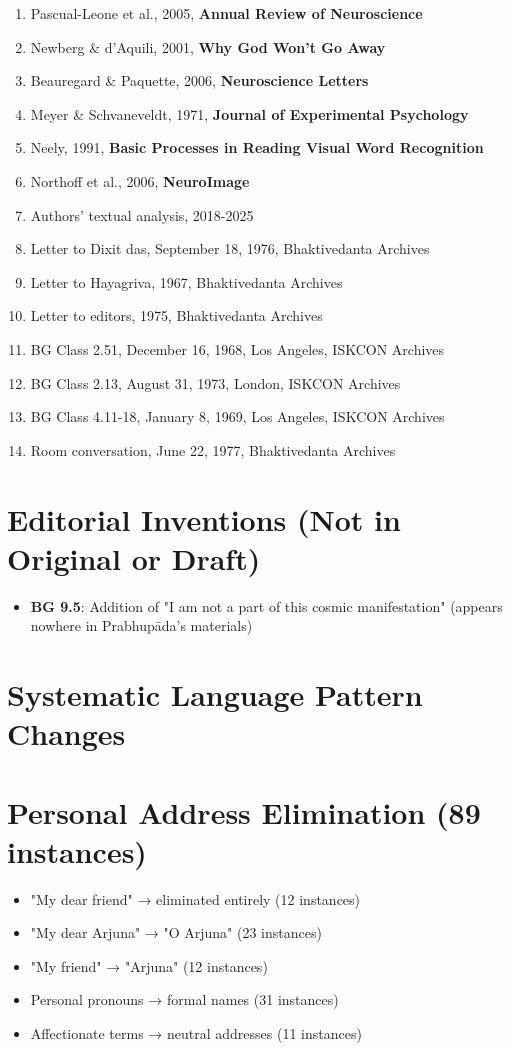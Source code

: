 \documentclass[11pt,twoside]{book}
\begin{document}
\begin{enumerate}
\item Pascual-Leone et al., 2005, \textbf{Annual Review of Neuroscience}
\item Newberg \& d'Aquili, 2001, \textbf{Why God Won't Go Away}
\item Beauregard \& Paquette, 2006, \textbf{Neuroscience Letters}
\item Meyer \& Schvaneveldt, 1971, \textbf{Journal of Experimental Psychology}
\item Neely, 1991, \textbf{Basic Processes in Reading Visual Word Recognition}
\item Northoff et al., 2006, \textbf{NeuroImage}
\item Authors' textual analysis, 2018-2025
\item Letter to Dixit das, September 18, 1976, Bhaktivedanta Archives
\item Letter to Hayagriva, 1967, Bhaktivedanta Archives
\item Letter to editors, 1975, Bhaktivedanta Archives
\item BG Class 2.51, December 16, 1968, Los Angeles, ISKCON Archives
\item BG Class 2.13, August 31, 1973, London, ISKCON Archives
\item BG Class 4.11-18, January 8, 1969, Los Angeles, ISKCON Archives
\item Room conversation, June 22, 1977, Bhaktivedanta Archives
\end{enumerate}
\section*{Editorial Inventions (Not in Original or Draft)}
\label{sec:org187b2d5}
\begin{itemize}
\item \textbf{\textbf{BG 9.5}}: Addition of "I am not a part of this cosmic manifestation" (appears nowhere in Prabhupāda's materials)
\end{itemize}
\section*{Systematic Language Pattern Changes}
\label{sec:orga4e4be7}

\section*{Personal Address Elimination (89 instances)}
\label{sec:org77d1ec4}
\begin{itemize}
\item "My dear friend" → eliminated entirely (12 instances)
\item "My dear Arjuna" → "O Arjuna" (23 instances)
\item "My friend" → "Arjuna" (12 instances)
\item Personal pronouns → formal names (31 instances)
\item Affectionate terms → neutral addresses (11 instances)
\end{itemize}
\end{document}
